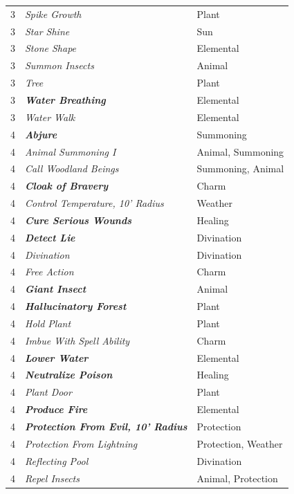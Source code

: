 \begin{multicols}{2}
\begin{tabular}{|p{}|p{}|p{}|}
3	& \textit{Spike Growth}	& Plant \\
\rowcolor[gray]{.9}3	& \textit{Star Shine}	& Sun \\
3	& \textit{Stone Shape}	& Elemental \\
\rowcolor[gray]{.9}3	& \textit{Summon Insects}	& Animal \\
3	& \textit{Tree}	& Plant \\
\rowcolor[gray]{.9}3	& \textbf{\textit{Water Breathing}}	& Elemental \\
3	& \textit{Water Walk}	& Elemental \\
\rowcolor[gray]{.9}4	& \textbf{\textit{Abjure}}	& Summoning \\
4	& \textit{Animal Summoning I}	& Animal, Summoning \\
\rowcolor[gray]{.9}4	& \textit{Call Woodland Beings}	& Summoning, Animal \\
4	& \textbf{\textit{Cloak of Bravery}}	& Charm \\
\rowcolor[gray]{.9}4	& \textit{Control Temperature, 10' Radius}	& Weather \\
4	& \textbf{\textit{Cure Serious Wounds}}	& Healing \\
\rowcolor[gray]{.9}4	& \textbf{\textit{Detect Lie}}	& Divination \\
4	& \textit{Divination}	& Divination \\
\rowcolor[gray]{.9}4	& \textit{Free Action}	& Charm \\
4	& \textbf{\textit{Giant Insect}}	& Animal \\
\rowcolor[gray]{.9}4	& \textbf{\textit{Hallucinatory Forest}}	& Plant \\
4	& \textit{Hold Plant}	& Plant \\
\rowcolor[gray]{.9}4	& \textit{Imbue With Spell Ability}	& Charm \\
4	& \textbf{\textit{Lower Water}}	& Elemental \\
\rowcolor[gray]{.9}4	& \textbf{\textit{Neutralize Poison}}	& Healing \\
4	& \textit{Plant Door}	& Plant \\
\rowcolor[gray]{.9}4	& \textbf{\textit{Produce Fire}}	& Elemental \\
4	& \textbf{\textit{Protection From Evil, 10' Radius}}	& Protection \\
\rowcolor[gray]{.9}4	& \textit{Protection From Lightning}	& Protection, Weather \\
4	& \textit{Reflecting Pool}	& Divination \\
\rowcolor[gray]{.9}4	& \textit{Repel Insects}	& Animal, Protection \\

\end{tabular}
\end{multicols}
